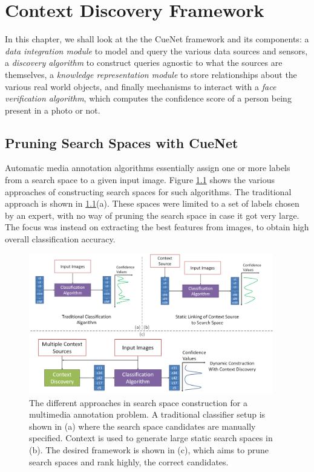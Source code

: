 \chapter{Context Discovery Framework}

In this chapter, we shall look at the the CueNet framework and its components: a \textit{data integration module} to model and query the various data sources and sensors, a \textit{discovery algorithm} to construct queries agnostic to what the sources are themselves, a \textit{knowledge representation module} to store relationships about the various real world objects, and finally mechanisms to interact with a \textit{face verification algorithm}, which computes the confidence score of a person being present in a photo or not.

\section{Pruning Search Spaces with CueNet}

Automatic media annotation algorithms essentially assign one or more labels from a search space to a given input image. Figure \ref{fig:with-without-cuenet} shows the various approaches of constructing search spaces for such algorithms. The traditional approach is shown in \ref{fig:with-without-cuenet}(a). These spaces were limited to a set of labels chosen by an expert, with no way of pruning the search space in case it got very large. 
The focus was instead on extracting the best features from images, to obtain high overall classification accuracy\cite{turk1991eigenfaces}.

\begin{figure}[t]
\centering
\includegraphics[width=0.95\textwidth]{media/with-without-cuenet-2.png}
\caption{The different approaches in search space construction for a multimedia annotation problem. A traditional classifier setup is shown in (a) where the search space candidates are manually specified. Context is used to generate large static search spaces in (b). The desired framework is shown in (c), which aims to prune search spaces and rank highly, the correct candidates.}
\label{fig:with-without-cuenet}
\end{figure}

